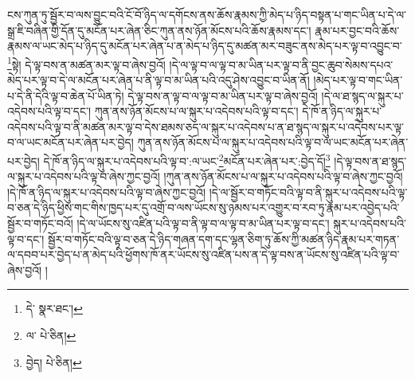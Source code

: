 ངས་ཀུན་ཏུ་སྦྱོར་བ་ལས་བྱུང་བའི་ངོ་བོ་ཉིད་ལ་དགོངས་ནས་ཆོས་རྣམས་ཀྱི་མེད་པ་ཉིད་བསྟན་པ་གང་ཡིན་པ་དེ་ལ་སྒྲ་ཇི་བཞིན་གྱི་དོན་དུ་མངོན་པར་ཞེན་ཅིང་ཀུན་ནས་ཉོན་མོངས་པའི་ཆོས་རྣམས་དང་། རྣམ་པར་བྱང་བའི་ཆོས་རྣམས་ལ་ཡང་མེད་པ་ཉིད་དུ་མངོན་པར་ཞེན་པ་ན་མེད་པ་ཉིད་དུ་མཚན་མར་བཟུང་ནས་མེད་པར་ལྟ་བ་འབྱུང་བ་\footnote{དེ་  སྣར་ཐང་། }སྟེ། དེ་ལྟ་བས་ན་མཚན་མར་ལྟ་བ་ཞེས་བྱའོ། །དེ་ལ་ལྟ་བ་ལ་ལྟ་བ་མ་ཡིན་པར་ལྟ་བ་ནི་བྱང་ཆུབ་སེམས་དཔའ་མེད་པར་ལྟ་བ་དེ་ལ་མངོན་པར་ཞེན་པ་ནི་ལྟ་བ་མ་ཡིན་པའི་འདུ་ཤེས་འབྱུང་བ་ཡིན་ནོ། །མེད་པར་ལྟ་བ་གང་ཡིན་པ་དེ་ནི་དེའི་ལྟ་བ་ཆེན་པོ་ཡིན་ཏེ། དེ་ལྟ་བས་ན་ལྟ་བ་ལ་ལྟ་བ་མ་ཡིན་པར་ལྟ་བ་ཞེས་བྱའོ། །དེ་ལ་ཐ་སྙད་ལ་སྐུར་པ་འདེབས་པའི་ལྟ་བ་དང་། ཀུན་ནས་ཉོན་མོངས་པ་ལ་སྐུར་པ་འདེབས་པའི་ལྟ་བ་དང་། དེ་ཁོ་ན་ཉིད་ལ་སྐུར་པ་འདེབས་པའི་ལྟ་བ་ནི་མཚན་མར་ལྟ་བ་དེས་ཐམས་ཅད་ལ་སྐུར་པ་འདེབས་པ་ན་ཐ་སྙད་ལ་སྐུར་པ་འདེབས་པར་ལྟ་བ་ལ་ཡང་མངོན་པར་ཞེན་པར་བྱེད། ཀུན་ནས་ཉོན་མོངས་པ་ལ་སྐུར་པ་འདེབས་པའི་ལྟ་བ་ལ་ཡང་མངོན་པར་ཞེན་པར་བྱེད། དེ་ཁོ་ན་ཉིད་ལ་སྐུར་པ་འདེབས་པའི་ལྟ་བ་:ལ་ཡང་\footnote{ལ་  པེ་ཅིན། }མངོན་པར་ཞེན་པར་:བྱེད་དོ།\footnote{བྱེད།  པེ་ཅིན། } །དེ་ལྟ་བས་ན་ཐ་སྙད་ལ་སྐུར་པ་འདེབས་པའི་ལྟ་བ་ཞེས་ཀྱང་བྱའོ། །ཀུན་ནས་ཉོན་མོངས་པ་ལ་སྐུར་པ་འདེབས་པའི་ལྟ་བ་ཞེས་ཀྱང་བྱའོ། །དེ་ཁོ་ན་ཉིད་ལ་སྐུར་པ་འདེབས་པའི་ལྟ་བ་ཞེས་ཀྱང་བྱའོ། །དེ་ལ་སྦྱོར་བ་གཏོང་བའི་ལྟ་བ་ནི་སྐུར་པ་འདེབས་པའི་ལྟ་བ་ཅན་དེ་ཉིད་ཕྱིས་གང་གིས་ཁྱད་པར་དུ་འགྲོ་བ་ལས་ཡོངས་སུ་ཉམས་པར་འགྱུར་བ་རབ་ཏུ་རྣམ་པར་འབྱེད་པའི་སྦྱོར་བ་གཏོང་བའོ། །དེ་ལ་ཡོངས་སུ་འཛིན་པའི་ལྟ་བ་ནི་ལྟ་བ་ལ་ལྟ་བ་མ་ཡིན་པར་ལྟ་བ་དང་། སྐུར་པ་འདེབས་པའི་ལྟ་བ་དང་། སྦྱོར་བ་གཏོང་བའི་ལྟ་བ་ཅན་དེ་ཉིད་གཞན་དག་དང་ལྷན་ཅིག་ཏུ་ཆོས་ཀྱི་མཚན་ཉིད་རྣམ་པར་གཏན་ལ་དབབ་པར་བྱེད་པ་ན་མེད་པའི་ཕྱོགས་ཁོ་ནར་ཡོངས་སུ་འཛིན་པས་ན་དེ་ལྟ་བས་ན་ཡོངས་སུ་འཛིན་པའི་ལྟ་བ་ཞེས་བྱའོ། །
